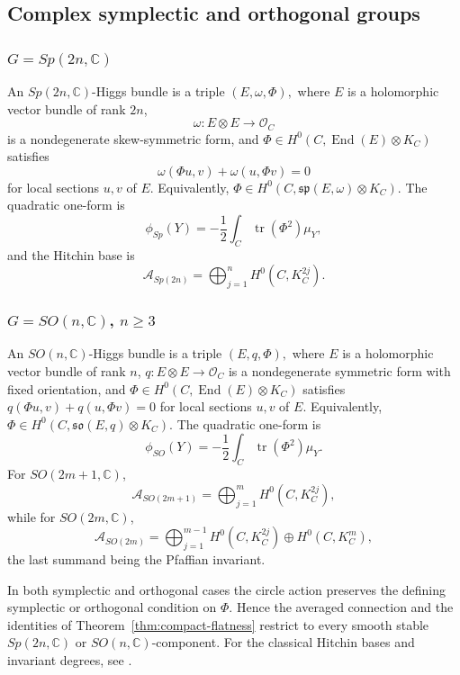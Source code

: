 \documentclass[11pt,reqno]{amsart}
\numberwithin{equation}{section}
\theoremstyle{plain}
\theoremstyle{definition}
\theoremstyle{remark}
\begin{document}
\subsection{Complex symplectic and orthogonal groups}

\subsubsection{\(G=Sp(2n,\mathbb C)\)} An \(Sp(2n,\mathbb C)\)-Higgs bundle is a triple
\(
        (E,\omega,\Phi),
\)
where \(E\) is a holomorphic vector bundle of rank \(2n\),
\[
        \omega:E\otimes E\longrightarrow \mathcal O_C
\]
is a nondegenerate skew-symmetric form, and
\(
        \Phi\in H^0(C,\operatorname{End}(E)\otimes K_C)
\)
satisfies
\[
        \omega(\Phi u,v)+\omega(u,\Phi v)=0
\]
for local sections \(u,v\) of \(E\). Equivalently,
\(
        \Phi\in H^0(C,\mathfrak{sp}(E,\omega)\otimes K_C).
\)
The quadratic one-form is
\[
        \phi_{Sp}(Y)
        =
        -\frac12\int_C\operatorname{tr}(\Phi^2)\mu_Y,
\]
and the Hitchin base is
\[
        \mathcal A_{Sp(2n)}
        =
        \bigoplus_{j=1}^{n}H^0(C,K_C^{2j}).
\]

\subsubsection{\(G=SO(n,\mathbb C)\), \(n\geq3\)} An \(SO(n,\mathbb C)\)-Higgs bundle is a triple
\(
        (E,q,\Phi),
\)
where \(E\) is a holomorphic vector bundle of rank \(n\),
\(
        q:E\otimes E\longrightarrow\mathcal O_C
\)
is a nondegenerate symmetric form with fixed orientation, and
\(
        \Phi\in H^0(C,\operatorname{End}(E)\otimes K_C)
\)
satisfies
\(
        q(\Phi u,v)+q(u,\Phi v)=0
\)
for local sections \(u,v\) of \(E\). Equivalently,
\(
        \Phi\in H^0(C,\mathfrak{so}(E,q)\otimes K_C).
\)
The quadratic one-form is
\[
        \phi_{SO}(Y)
        =
        -\frac12\int_C\operatorname{tr}(\Phi^2)\mu_Y.
\]
For \(SO(2m+1,\mathbb C)\),
\[
        \mathcal A_{SO(2m+1)}
        =
        \bigoplus_{j=1}^{m}H^0(C,K_C^{2j}),
\]
while for \(SO(2m,\mathbb C)\),
\[
        \mathcal A_{SO(2m)}
        =
        \bigoplus_{j=1}^{m-1}H^0(C,K_C^{2j})
        \oplus H^0(C,K_C^m),
\]
the last summand being the Pfaffian invariant.

In both symplectic and orthogonal cases the circle action preserves the defining symplectic or orthogonal
condition on \(\Phi\). Hence the averaged connection and the identities of
Theorem~\ref{thm:compact-flatness} restrict to every smooth stable
\(Sp(2n,\mathbb C)\) or \(SO(n,\mathbb C)\)-component. For the classical
Hitchin bases and invariant degrees, see \cite{Hitchin1987}.
\end{document}
